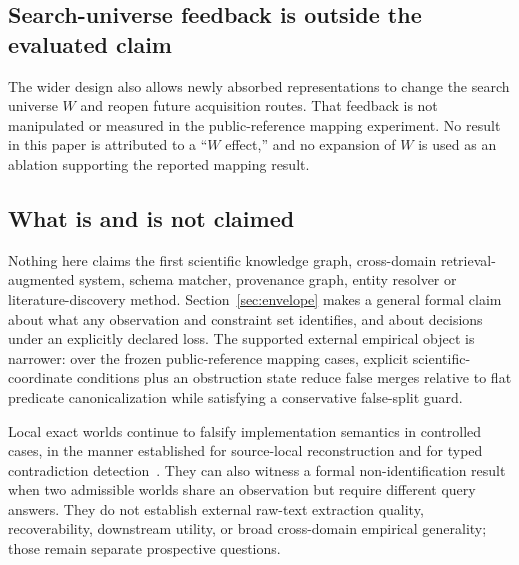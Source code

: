 \subsection{Search-universe feedback is outside the evaluated claim}

The wider design also allows newly absorbed representations to change the
search universe $W$ and reopen future acquisition routes. That feedback is not
manipulated or measured in the public-reference mapping experiment. No result
in this paper is attributed to a ``$W$ effect,'' and no expansion of $W$ is
used as an ablation supporting the reported mapping result.

\subsection{What is and is not claimed}

Nothing here claims the first scientific knowledge graph, cross-domain
retrieval-augmented system, schema matcher, provenance graph, entity resolver
or literature-discovery method. Section~\ref{sec:envelope} makes a general
formal claim about what any observation and constraint set identifies, and
about decisions under an explicitly declared loss. The supported external
empirical object is narrower: over the frozen public-reference mapping cases,
explicit scientific-coordinate conditions plus an obstruction state reduce
false merges relative to flat predicate canonicalization while satisfying a
conservative false-split guard.

Local exact worlds continue to falsify implementation semantics in controlled
cases, in the manner established for source-local reconstruction and for typed
contradiction detection~\cite{orion2025paper1,orion2025paper2}. They can also
witness a formal non-identification result when two admissible worlds share an
observation but require different query answers. They do not establish
external raw-text extraction quality, recoverability, downstream utility, or
broad cross-domain empirical generality; those remain separate prospective
questions.

\endinput
